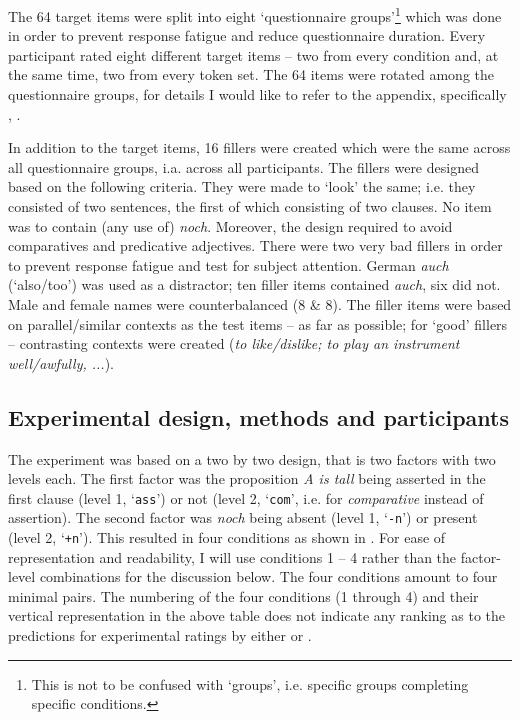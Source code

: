 \documentclass[output=paper,
modfonts
]{langscibook}
\begin{document}
The 64 target items were split into eight `questionnaire groups'\footnote{ This is not to be confused with `groups', i.e. specific groups completing specific conditions.} which was done in order to prevent response fatigue and reduce questionnaire duration. Every participant rated eight different target items -- two from every condition and, at the same time, two from every token set. The 64 items were rotated among the questionnaire groups, for details I would like to refer to the appendix, specifically , \pageref{tab:questionnaire_combos}.

In addition to the target items, 16 fillers were created which were the same across all questionnaire groups, i.a. across all participants. The fillers were designed based on the following criteria. They were made to `look' the same; i.e. they consisted of two sentences, the first of which consisting of two clauses. No item was to contain (any use of) \textit{noch}. Moreover, the design required to avoid comparatives and predicative adjectives. There were two very bad fillers in order to prevent response fatigue and test for subject attention. German \textit{auch} (`also/too') was used as a distractor; ten filler items contained \textit{auch}, six did not. Male and female names were counterbalanced (8 \& 8). The filler items were based on parallel/similar contexts as the test items -- as far as possible; for `good' fillers -- contrasting contexts were created (\textit{to like/dislike; to play an instrument well/awfully, ...}).


\subsection{Experimental design, methods and participants}\label{experimental_design_and_methods}

The experiment was based on a two by two design, that is two factors with two levels each. The first factor was the proposition \textit{A is tall} being asserted in the first clause (level 1, `\texttt{ass}') or not (level 2, `\texttt{com}', i.e. for \textit{comparative} instead of assertion). The second factor was \textit{noch} being absent (level 1, `\texttt{-n}') or present (level 2, `\texttt{+n}'). This resulted in four conditions as shown in . For ease of representation and readability, I will use conditions 1 -- 4 rather than the factor-level combinations for the discussion below. The four conditions amount to four minimal pairs. The numbering of the four conditions (1 through 4) and their vertical representation in the above table does not indicate any ranking as to the predictions for experimental ratings by either \citeauthor{umbach2009a_comp} or \citeauthor{Hofstetter2013}. 
\end{document}
